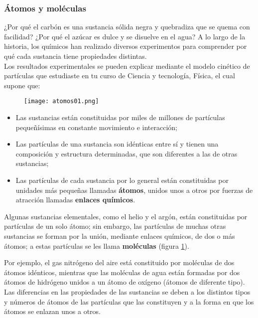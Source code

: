 \subsubsection{\'Atomos y moléculas}

¿Por qué el carbón es una sustancia sólida negra y quebradiza que se quema con facilidad?
¿Por qué el azúcar es dulce y se disuelve en el agua? A lo largo de la historia, los químicos han realizado
diversos experimentos para comprender por qué cada sustancia tiene propiedades distintas.\\

Los resultados experimentales se pueden explicar mediante el modelo
cinético de partículas que estudiaste en tu curso de Ciencia y tecnología, Física, el cual supone que:

\begin{figure}[H]
    \centering
    \texttt{[image: atomos01.png]}
    \label{fig:atomos01}
\end{figure}

\begin{itemize}
    \item[\checkmark] Las sustancias están constituidas por miles de millones de partículas pequeñísimas
          en constante movimiento e interacción;
    \item[\checkmark] Las partículas de una sustancia son idénticas entre sí y tienen una composición y
          estructura determinadas, que son diferentes a las de otras sustancias;
    \item[\checkmark] Las partículas de cada sustancia por lo general están constituidas por unidades más
          pequeñas llamadas \textbf{átomos}, unidos unos a otros por fuerzas de atracción llamadas \textbf{enlaces químicos}.
\end{itemize}

Algunas sustancias elementales, como el helio y el argón, están constituidas por partículas de un solo átomo; sin embargo, las
partículas de muchas otras sustancias se forman por la unión, mediante enlaces químicos, de dos o más átomos; a estas partículas
se les llama \textbf{moléculas} (figura \ref{fig:atomos01}).

Por ejemplo, el gas nitrógeno del aire está constituido por moléculas de dos átomos
idénticos, mientras que las moléculas de agua están formadas por dos átomos de
hidrógeno unidos a un átomo de oxígeno (átomos de diferente tipo).
Las diferencias en las propiedades de las sustancias se deben a los distintos tipos
y números de átomos de las partículas que las constituyen y a la forma en que los
átomos se enlazan unos a otros.\\

